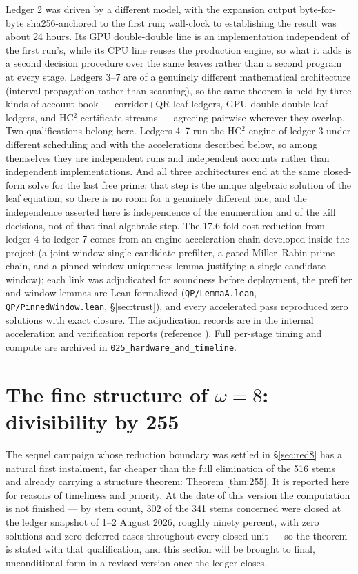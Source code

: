 \documentclass[11pt]{article}
\theoremstyle{remark}
\begin{document}
Ledger 2 was driven by a different model, with the expansion output byte-for-byte sha256-anchored to the first run; wall-clock to establishing the result was about 24 hours. Its GPU double-double line is an implementation independent of the first run's, while its CPU line reuses the production engine, so what it adds is a second decision procedure over the same leaves rather than a second program at every stage. Ledgers 3--7 are of a genuinely different mathematical architecture (interval propagation rather than scanning), so the same theorem is held by three kinds of account book --- corridor+QR leaf ledgers, GPU double-double leaf ledgers, and HC$^2$ certificate streams --- agreeing pairwise wherever they overlap. Two qualifications belong here. Ledgers 4--7 run the HC$^2$ engine of ledger 3 under different scheduling and with the accelerations described below, so among themselves they are independent runs and independent accounts rather than independent implementations. And all three architectures end at the same closed-form solve for the last free prime: that step is the unique algebraic solution of the leaf equation, so there is no room for a genuinely different one, and the independence asserted here is independence of the enumeration and of the kill decisions, not of that final algebraic step. The 17.6-fold cost reduction from ledger 4 to ledger 7 comes from an engine-acceleration chain developed inside the project (a joint-window single-candidate prefilter, a gated Miller--Rabin prime chain, and a pinned-window uniqueness lemma justifying a single-candidate window); each link was adjudicated for soundness before deployment, the prefilter and window lemmas are Lean-formalized (\texttt{QP/LemmaA.lean}, \texttt{QP/PinnedWindow.lean}, \S\ref{sec:trust}), and every accelerated pass reproduced zero solutions with exact closure. The adjudication records are in the internal acceleration and verification reports (reference \cite{internal}). Full per-stage timing and compute are archived in \texttt{025\_hardware\_and\_timeline}.

\section{The fine structure of $\omega = 8$: divisibility by 255}\label{sec:255}

The sequel campaign whose reduction boundary was settled in \S\ref{sec:red8} has a natural first instalment, far cheaper than the full elimination of the 516 stems and already carrying a structure theorem: Theorem \ref{thm:255}. It is reported here for reasons of timeliness and priority. At the date of this version the computation is not finished --- by stem count, 302 of the 341 stems concerned were closed at the ledger snapshot of 1--2 August 2026, roughly ninety percent, with zero solutions and zero deferred cases throughout every closed unit --- so the theorem is stated with that qualification, and this section will be brought to final, unconditional form in a revised version once the ledger closes.
\end{document}
